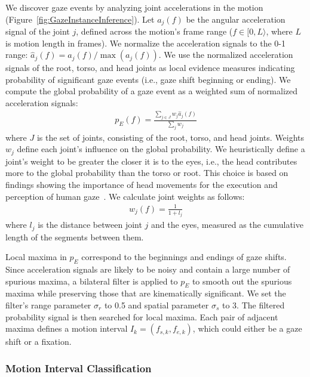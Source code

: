 We discover gaze events by analyzing joint accelerations in the motion (Figure~\ref{fig:GazeInstanceInference}). Let $a_j(f)$ be the angular acceleration signal of the joint $j$, defined across the motion's frame range ($f \in [0, L\rangle$, where $L$ is motion length in frames). We normalize the acceleration signals to the 0-1 range: $\hat{a}_j(f) = a_j(f) / \mathop{max}(a_j(f))$. We use the normalized acceleration signals of the root, torso, and head joints as local evidence measures indicating probability of significant gaze events (i.e., gaze shift beginning or ending). We compute the global probability of a gaze event as a weighted sum of normalized acceleration signals:
%
\begin{align} \label{eq:GazeEventProbability}
p_E(f) = \frac{\sum_{j \in J} w_j \hat{a}_j(f)}{\sum_j w_j}
\end{align}
%
where $J$ is the set of joints, consisting of the root, torso, and head joints. Weights $w_j$ define each joint's influence on the global probability. We heuristically define a joint's weight to be greater the closer it is to the eyes, i.e., the head contributes more to the global probability than the torso or root. This choice is based on findings showing the importance of head movements for the execution and perception of human gaze~\citep{hietanen1999does}. We calculate joint weights as follows:
%
\begin{align} \label{eq:GazeJointWeight}
w_j(f) = \frac{1}{1 + l_j}
\end{align}
%
where $l_j$ is the distance between joint $j$ and the eyes, measured as the cumulative length of the segments between them.

Local maxima in $p_E$ correspond to the beginnings and endings of gaze shifts. Since acceleration signals are likely to be noisy and contain a large number of spurious maxima, a bilateral filter is applied to $p_E$ to smooth out the spurious maxima while preserving those that are kinematically significant. We set the filter's range parameter $\sigma_r$ to 0.5 and spatial parameter $\sigma_s$ to 3. The filtered probability signal is then searched for local maxima. Each pair of adjacent maxima defines a motion interval $I_k = (f_{s,k}, f_{e,k})$, which could either be a gaze shift or a fixation.

\subsubsection{Motion Interval Classification}

